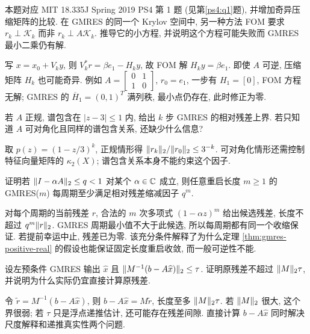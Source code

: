 \begin{exercise}
\label{nla:fom-exercise}
本题对应 MIT 18.335J Spring 2019 PS4 第 1 题 (见第\ref{ps4:q1}题), 并增加奇异压缩矩阵的比较. 在 GMRES 的同一个 Krylov 空间中, 另一种方法 FOM 要求 $r_k\perp\mathcal K_k$ 而非 $r_k\perp A\mathcal K_k$. 推导它的小方程, 并说明这个方程可能失败而 GMRES 最小二乘仍有解.
\end{exercise}
\begin{solution}
写 $x=x_0+V_ky$, 则 $V_k^*r=\beta e_1-H_ky$, 故 FOM 解 $H_ky=\beta e_1$. 即使 $A$ 可逆, 压缩矩阵 $H_k$ 也可能奇异. 例如 $A=\begin{bmatrix}0&1\\1&0\end{bmatrix}$, $r_0=e_1$, 一步有 $H_1=[0]$, FOM 方程无解; GMRES 的 $\overline H_1=(0,1)^T$ 满列秩, 最小点仍存在, 此时修正为零.
\end{solution}
\begin{exercise}
若 $A$ 正规, 谱包含在 $|z-3|\le1$ 内, 给出 $k$ 步 GMRES 的相对残差上界. 若只知道 $A$ 可对角化且同样的谱包含关系, 还缺少什么信息?
\end{exercise}
\begin{solution}
取 $p(z)=(1-z/3)^k$, 正规情形得 $\lVert r_k\rVert_2/\lVert r_0\rVert_2\le3^{-k}$. 可对角化情形还需控制特征向量矩阵的 $\kappa_2(X)$; 谱包含关系本身不能约束这个因子.
\end{solution}
\begin{exercise}
证明若 $\lVert I-\alpha A\rVert_2\le q<1$ 对某个 $\alpha\in\mathbb C$ 成立, 则任意重启长度 $m\ge1$ 的 GMRES($m$) 每周期至少满足相对残差缩减因子 $q^m$.
\end{exercise}
\begin{solution}
对每个周期的当前残差 $r$, 合法的 $m$ 次多项式 $(1-\alpha z)^m$ 给出候选残差, 长度不超过 $q^m\lVert r\rVert_2$. GMRES 周期最小值不大于此候选, 所以每周期都有同一个收缩保证. 若提前幸运中止, 残差已为零. 该充分条件解释了为什么定理 \ref{thm:gmres-positive-real} 的假设也能保证固定长度重启收敛, 而一般可逆性不能.
\end{solution}
\begin{exercise}
设左预条件 GMRES 输出 $\widehat x$ 且 $\lVert M^{-1}(b-A\widehat x)\rVert_2\le\tau$. 证明原残差不超过 $\lVert M\rVert_2\tau$, 并说明为什么实际仍宜直接计算原残差.
\end{exercise}
\begin{solution}
令 $\widetilde r=M^{-1}(b-A\widehat x)$, 则 $b-A\widehat x=M\widetilde r$, 长度至多 $\lVert M\rVert_2\tau$. 若 $\lVert M\rVert_2$ 很大, 这个界很弱; 若 $\tau$ 只是浮点递推估计, 还可能存在残差间隙. 直接计算 $b-A\widehat x$ 同时解决尺度解释和递推真实性两个问题.
\end{solution}
